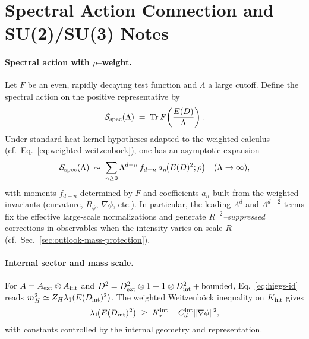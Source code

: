 \documentclass[11pt]{article}
\theoremstyle{definition}
\begin{document}
    \section{Spectral Action Connection and SU(2)/SU(3) Notes}
    \label{app:spectral-action}
    
    \paragraph{Spectral action with $\rho$–weight.}
    Let $F$ be an even, rapidly decaying test function and $\Lambda$ a large cutoff.
    Define the spectral action on the positive representative by 
    \[
    \mathcal{S}_{\rm spec}(\Lambda)\;=\;\mathrm{Tr}\,F\!\left(\frac{E(D)}{\Lambda}\right).
    \]
    Under standard heat-kernel hypotheses adapted to the weighted calculus (cf.\ Eq.~\eqref{eq:weighted-weitzenbock}), one has an asymptotic expansion
    \[
    \mathcal{S}_{\rm spec}(\Lambda)\;\sim\;\sum_{n\ge 0} \Lambda^{d-n}\,f_{d-n}\,a_n\!\big(E(D)^2;\rho\big)
    \quad(\Lambda\to\infty),
    \]
    with moments $f_{d-n}$ determined by $F$ and coefficients $a_n$ built from the weighted invariants (curvature, $R_\phi$, $\nabla\phi$, etc.). 
    In particular, the leading $\Lambda^{d}$ and $\Lambda^{d-2}$ terms fix the effective large-scale normalizations and generate \emph{$R^{-2}$–suppressed} corrections in observables when the intensity varies on scale $R$ (cf.\ Sec.~\ref{sec:outlook-mass-protection}).
    
    \paragraph{Internal sector and mass scale.}
    For $A=A_{\rm ext}\otimes A_{\rm int}$ and $D^2=D_{\rm ext}^2\otimes\mathbf{1}+\mathbf{1}\otimes D_{\rm int}^2+\text{bounded}$, 
    Eq.~\eqref{eq:higgs-id} reads $m_H^2\simeq Z_H \lambda_1(E(D_{\rm int})^2)$.
    The weighted Weitzenböck inequality on $K_{\rm int}$ gives
    \[
    \lambda_1\!\big(E(D_{\rm int})^2\big)\;\ge\;K_\ast^{\rm int}-C_d^{\rm int}\|\nabla\phi\|^2,
    \]
    with constants controlled by the internal geometry and representation.
    
\end{document}
